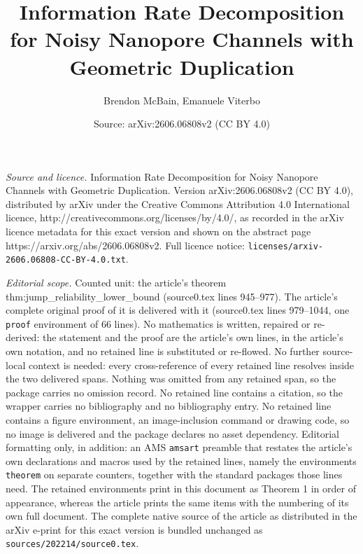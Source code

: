 \documentclass[10pt,a4paper]{amsart}
\title{Information Rate Decomposition for Noisy Nanopore Channels with Geometric Duplication}
\author{Brendon McBain, Emanuele Viterbo}
\date{Source: arXiv:2606.06808v2 (CC BY 4.0)}
\begin{document}
\maketitle

\noindent\emph{Source and licence.} Information Rate Decomposition for Noisy Nanopore Channels with Geometric Duplication. Version arXiv:2606.06808v2 (CC BY 4.0), distributed by arXiv under the Creative Commons Attribution 4.0 International licence, http://creativecommons.org/licenses/by/4.0/, as recorded in the arXiv licence metadata for this exact version and shown on the abstract page https://arxiv.org/abs/2606.06808v2. Full licence notice: \texttt{licenses/arxiv-2606.06808-CC-BY-4.0.txt}.\par\smallskip

\noindent\textit{Editorial scope.} Counted unit: the article's theorem thm:jump\_reliability\_lower\_bound (source0.tex lines 945--977). The article's complete original proof of it is delivered with it (source0.tex lines 979--1044, one \texttt{proof} environment of 66 lines). No mathematics is written, repaired or re-derived: the statement and the proof are the article's own lines, in the article's own notation, and no retained line is substituted or re-flowed.  No further source-local context is needed: every cross-reference of every retained line resolves inside the two delivered spans.  Nothing was omitted from any retained span, so the package carries no omission record.  No retained line contains a citation, so the wrapper carries no bibliography and no bibliography entry.  No retained line contains a figure environment, an image-inclusion command or drawing code, so no image is delivered and the package declares no asset dependency.  Editorial formatting only, in addition: an AMS \texttt{amsart} preamble that restates the article's own declarations and macros used by the retained lines, namely the environments \texttt{theorem} on separate counters, together with the standard packages those lines need.  The retained environments print in this document as Theorem 1 in order of appearance, whereas the article prints the same items with the numbering of its own full document.  The complete native source of the article as distributed in the arXiv e-print for this exact version is bundled unchanged as \texttt{sources/202214/source0.tex}.
\end{document}
